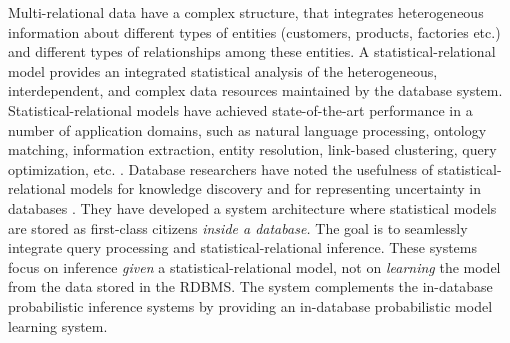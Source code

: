 Multi-relational data have a complex structure, that integrates heterogeneous information about different types of entities (customers, products, factories etc.) and different types of relationships among these entities. 
A statistical-relational model provides an integrated statistical analysis of the heterogeneous,  interdependent, and complex data resources maintained by the database system. 
%
Statistical-relational models have achieved state-of-the-art performance in a number of application domains, such as natural language processing, ontology matching, information extraction, entity resolution, link-based clustering, query optimization, etc. %
\cite{Domingos2009,Getoor2001,Niu2011}.
%
Database researchers have noted the usefulness of statistical-relational models for knowledge discovery and for representing uncertainty in databases 
\cite{Singh2013,Wang2008}. 
%
They have developed a system architecture where statistical models are stored as first-class citizens {\em inside a database.} The goal is to seamlessly integrate query processing and statistical-relational inference. %
%
%
%
These systems focus  on inference {\em given} a statistical-relational model, not on {\em learning} the model from the data stored in the RDBMS. 
The \FB system complements the in-database probabilistic inference systems by providing an in-database probabilistic model learning system. 

